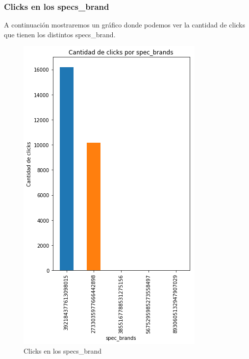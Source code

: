 \documentclass[a4paper, 12pt]{article}
\newcommand\tab[1][1cm]{\hspace*{#1}}
\begin{document}
	\subsubsection{Clicks en los specs\_brand}
		\tab A continuación mostraremos un gráfico donde podemos ver la cantidad de clicks que tienen los distintos specs\_brand.

		\FloatBarrier
		\begin{figure}[h]
			\centering
			\includegraphics[width=\textwidth]{images/clicks/clicks_specs_brand.png}
			\caption{Clicks en los specs\_brand}
		\end{figure}
		\FloatBarrier
\end{document}
